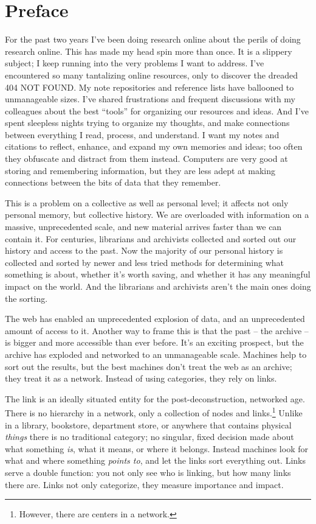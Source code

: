\section{Preface}


For the past two years I've been doing research online about the %
perils of doing research online. This has made my head spin more than once. It is a slippery subject; I keep running into the very problems I want to address. I've encountered so many tantalizing online resources, only to discover the dreaded 404 NOT FOUND. My note repositories and reference lists have ballooned to unmanageable sizes. I've shared frustrations and frequent discussions with my colleagues about the best ``tools'' for organizing our resources and ideas. And I've spent sleepless nights trying to organize my thoughts, and make connections between everything I read, process, and understand. I want my notes and citations to reflect, enhance, and expand my own memories and ideas; too often they obfuscate and distract from them instead. Computers are very good at storing and remembering information, but they are less adept at making connections between the bits of data that they remember.


This is a problem on a collective as well as personal level; it affects not only personal memory, but collective history. We are overloaded with information on a massive, unprecedented scale, and new material arrives faster than we can contain it. For centuries, librarians and archivists collected and sorted out our history and access to the past. Now the majority of our personal history is collected and sorted by newer and less tried methods for determining what something is about, whether it's worth saving, and whether it has any meaningful impact on the world. And the librarians and archivists aren't the main ones doing the sorting.

The web has enabled an unprecedented explosion of data, and an unprecedented amount of access to it. Another way to frame this is that the past -- the archive -- is bigger and more accessible than ever before. It's an exciting prospect, but the archive has exploded and networked to an unmanageable scale. Machines help to sort out the results, but the best machines don't treat the web as an archive; they treat it as a network. Instead of using categories, they rely on links.

The link is an ideally situated entity for the post-deconstruction, networked age. There is no hierarchy in a network, only a collection of nodes and links.\footnote{However, there are centers in a network.} Unlike in a library, bookstore, department store, or anywhere that contains physical \emph{things} there is no traditional category; no singular, fixed decision made about what something \emph{is}, what it means, or where it belongs. Instead machines look for what and where something \emph{points to}, and let the links sort everything out. Links serve a double function: you not only see who is linking, but how many links there are. Links not only categorize, they measure importance and impact.

